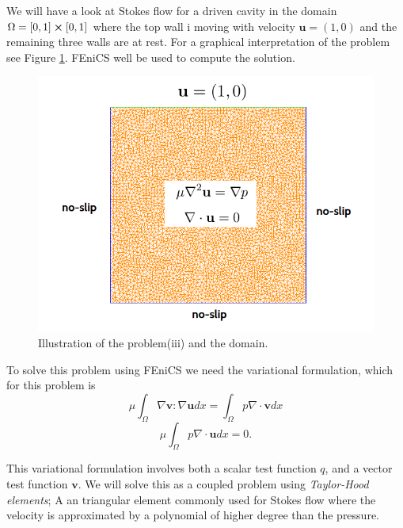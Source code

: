\documentclass[11pt,a4paper,english]{article}
\numberwithin{equation}{section}
\begin{document}
We will have a look at Stokes flow for a driven cavity in the domain $\Omega = [0,1] \cross [0,1]$ where the top wall i moving with velocity $\mathbf{u} = (1,0)$ and the remaining three walls are at rest. For a graphical interpretation of the problem see Figure \ref{fig:stokes_square}. FEniCS well be used to compute the solution. 

\begin{figure}[h!]
\begin{center}
  \includegraphics[scale=0.4]{stokes_square.png}
  \end{center}
  \caption{Illustration of the problem(iii) and the domain.}
  \label{fig:stokes_square}
\end{figure}

To solve this problem using FEniCS we need the variational formulation, which for this problem is
\begin{equation}
\mu \int_\Omega \nabla \mathbf{v}:\nabla \mathbf{u} dx = \int_\Omega p \nabla \cdot \mathbf{v} dx 
\end{equation}
\begin{equation}
\mu \int_\Omega p\nabla \cdot \mathbf{u} dx = 0.
\end{equation}

This variational formulation involves both a scalar test function $q$, and a vector test function $\mathbf{v}$. We will solve this as a coupled problem using \emph{Taylor-Hood elements}; A an triangular element commonly used for Stokes flow where the velocity is approximated by a polynomial of higher degree than the pressure. 
\end{document}
